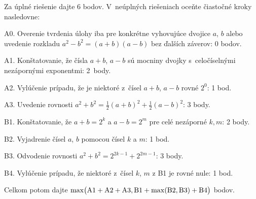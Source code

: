 {\schemaABC
Za úplné riešenie dajte 6 bodov. V~neúplných riešeniach oceňte
čiastočné kroky nasledovne:
\item{A0.} Overenie tvrdenia úlohy iba pre konkrétne vyhovujúce dvojice $a$, $b$ alebo uvedenie rozkladu ${a^2 - b^2} = (a+b)(a-b)$ bez ďalších záverov: 0 bodov.
\item{A1.} Konštatovanie, že čísla $a+b$, $a-b$ sú mocniny dvojky s~celočíselnými nezápornými exponentmi: 2~body.
\item{A2.} Vylúčenie prípadu, že je niektoré z~čísel $a+b$, $a-b$ rovné $2^0$: 1 bod.
\item{A3.} Uvedenie rovnosti $a^2+b^2=\frac{1}{2}(a+b)^2 + \frac{1}{2}(a-b)^2$: 3 body.
\item{B1.} Konštatovanie, že $a+b = 2^k$ a $a-b =2^m$ pre celé nezáporné $k,m$: 2 body.
\item{B2.} Vyjadrenie čísel $a$, $b$ pomocou čísel $k$ a $m$: 1 bod.
\item{B3.} Odvodenie rovnosti $a^2+b^2=2^{2k-1} + 2^{2m-1}$: 3 body.
\item{B4.} Vylúčenie prípadu, že niektoré z~čísel $k$, $m$ z B1 je rovné nule: 1 bod.

\noindent
Celkom potom dajte
$\rm\max\bigl(A1+A2+A3, B1+\max(B2,B3)+B4\bigr)$ bodov.
\endschema
}

